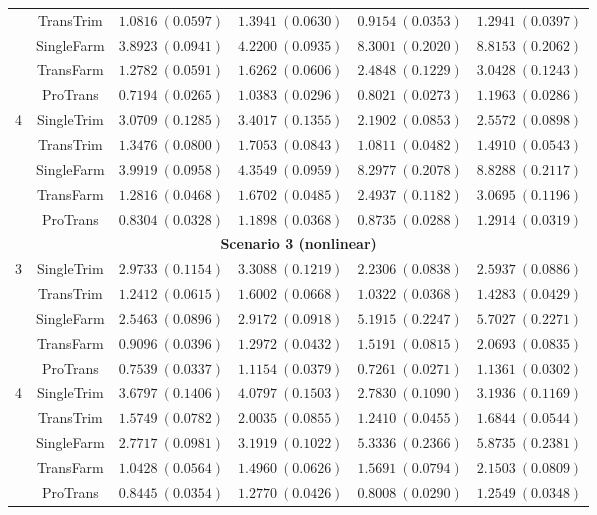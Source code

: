 \documentclass[12pt]{article}
\begin{document}
\begin{table}[!ht]
\begin{tabular}{cccccc}
& TransTrim   & $1.0816\ (0.0597)$ & $1.3941\ (0.0630)$ & $0.9154\ (0.0353)$ & $1.2941\ (0.0397)$ \\
& SingleFarm  & $3.8923\ (0.0941)$ & $4.2200\ (0.0935)$ & $8.3001\ (0.2020)$ & $8.8153\ (0.2062)$ \\
& TransFarm   & $1.2782\ (0.0591)$ & $1.6262\ (0.0606)$ & $2.4848\ (0.1229)$ & $3.0428\ (0.1243)$ \\
& ProTrans    & $\bm{0.7194}\ (0.0265)$ & $\bm{1.0383}\ (0.0296)$ & $\bm{0.8021}\ (0.0273)$ & $\bm{1.1963}\ (0.0286)$ \\
\hline
\multirow{5}{*}{4}
& SingleTrim  & $3.0709\ (0.1285)$ & $3.4017\ (0.1355)$ & $2.1902\ (0.0853)$ & $2.5572\ (0.0898)$ \\
& TransTrim   & $1.3476\ (0.0800)$ & $1.7053\ (0.0843)$ & $1.0811\ (0.0482)$ & $1.4910\ (0.0543)$ \\
& SingleFarm  & $3.9919\ (0.0958)$ & $4.3549\ (0.0959)$ & $8.2977\ (0.2078)$ & $8.8288\ (0.2117)$ \\
& TransFarm   & $1.2816\ (0.0468)$ & $1.6702\ (0.0485)$ & $2.4937\ (0.1182)$ & $3.0695\ (0.1196)$ \\
& ProTrans    & $\bm{0.8304}\ (0.0328)$ & $\bm{1.1898}\ (0.0368)$ & $\bm{0.8735}\ (0.0288)$ & $\bm{1.2914}\ (0.0319)$ \\
        \hline
         \multicolumn{6}{c}{\textbf{Scenario 3 (nonlinear)}}\\
        \hline
\multirow{5}{*}{3}
& SingleTrim  & $2.9733\ (0.1154)$  & $3.3088\ (0.1219)$  & $2.2306\ (0.0838)$  & $2.5937\ (0.0886)$ \\
& TransTrim   & $1.2412\ (0.0615)$ & $1.6002\ (0.0668)$  & $1.0322\ (0.0368)$ & $1.4283\ (0.0429)$ \\
& SingleFarm  & $2.5463\ (0.0896)$ & $2.9172\ (0.0918)$ & $5.1915\ (0.2247)$ & $5.7027\ (0.2271)$ \\
& TransFarm   & $0.9096\ (0.0396)$  & $1.2972\ (0.0432)$ & $1.5191\ (0.0815)$ & $2.0693\ (0.0835)$  \\
& ProTrans  & $\bm{0.7539}\ (0.0337)$ & $\bm{1.1154}\ (0.0379)$ & $\bm{0.7261}\ (0.0271)$ & $\bm{1.1361}\ (0.0302)$ \\
\hline
\multirow{5}{*}{4}
& SingleTrim  & $3.6797\ (0.1406)$ & $4.0797\ (0.1503)$ & $2.7830\ (0.1090)$  & $3.1936\ (0.1169)$  \\
& TransTrim   & $1.5749\ (0.0782)$  & $2.0035\ (0.0855)$ & $1.2410\ (0.0455)$& $1.6844\ (0.0544)$  \\
& SingleFarm  & $2.7717\ (0.0981)$  & $3.1919\ (0.1022)$ & $5.3336\ (0.2366)$ & $5.8735\ (0.2381)$ \\
& TransFarm   & $1.0428\ (0.0564)$ & $1.4960\ (0.0626)$& $1.5691\ (0.0794)$ & $2.1503\ (0.0809)$  \\
& ProTrans    & $\bm{0.8445}\ (0.0354)$ & $\bm{1.2770}\ (0.0426)$ & $\bm{0.8008}\ (0.0290)$  & $\bm{1.2549}\ (0.0348)$ \\
        \bottomrule
    \end{tabular}
\end{table}
\end{document}
